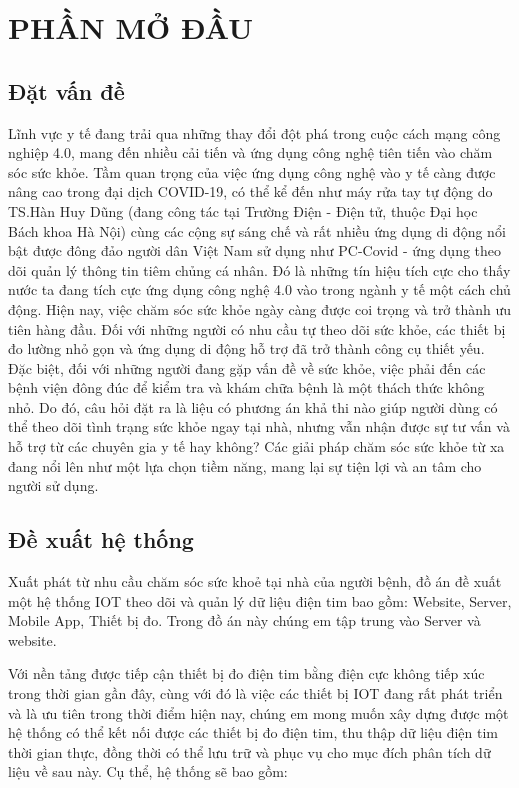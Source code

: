 
\section*{PHẦN MỞ ĐẦU}
\subsection*{Đặt vấn đề}


Lĩnh vực y tế đang trải qua những thay đổi đột phá trong cuộc cách mạng công nghiệp 4.0, mang đến nhiều cải tiến và ứng dụng công nghệ tiên tiến vào chăm sóc sức khỏe.
Tầm quan trọng của việc ứng dụng công nghệ vào y tế càng được nâng cao trong đại dịch COVID-19,
có thể kể đến như máy rửa tay tự động do TS.Hàn Huy Dũng (đang công tác tại Trường Điện - Điện tử, thuộc Đại học Bách khoa Hà Nội) 
cùng các cộng sự sáng chế \cite{ref_thay_dzung} và rất nhiều ứng dụng di động nổi bật được đông đảo người dân Việt Nam sử dụng như PC-Covid - ứng dụng theo dõi quản lý thông tin tiêm chủng cá nhân. Đó là những tín hiệu tích cực cho thấy nước ta đang tích cực ứng
dụng công nghệ 4.0 vào trong ngành y tế một cách chủ động. Hiện nay, việc chăm sóc sức khỏe ngày càng được coi trọng và trở thành ưu tiên hàng đầu. Đối
 với những người có nhu cầu tự theo dõi sức khỏe, các thiết bị đo lường nhỏ gọn và ứng dụng di động hỗ trợ đã trở thành công cụ thiết yếu. Đặc biệt,
  đối với những người đang gặp vấn đề về sức khỏe, việc phải đến các bệnh viện đông đúc để kiểm tra và khám chữa bệnh là một thách thức không nhỏ. Do đó,
   câu hỏi đặt ra là liệu có phương án khả thi nào giúp người dùng có thể theo dõi tình trạng sức khỏe ngay tại nhà, nhưng vẫn nhận được sự tư vấn và hỗ trợ từ các chuyên gia y tế hay không? Các giải pháp chăm sóc sức khỏe từ xa đang nổi lên như một lựa chọn tiềm năng, mang lại sự tiện lợi và an tâm cho người sử dụng.

\subsection*{Đề xuất hệ thống}

Xuất phát từ nhu cầu chăm sóc sức khoẻ tại nhà của người bệnh, đồ án đề xuất một hệ thống IOT theo dõi và quản lý dữ liệu điện tim bao gồm: Website, Server, Mobile App, Thiết bị đo. Trong đồ án này chúng em tập trung vào Server và website.

Với nền tảng được tiếp cận thiết bị đo điện tim bằng điện cực không tiếp xúc trong thời gian gần đây, 
cùng với đó là việc các thiết bị IOT đang rất phát triển và là ưu tiên trong thời điểm hiện nay, chúng em mong muốn xây dựng được một hệ thống
có thể kết nối được các thiết bị đo điện tim, thu thập dữ liệu điện tim thời gian thực, đồng thời có thể lưu trữ và phục vụ cho mục đích
phân tích dữ liệu về sau này. Cụ thể, hệ thống sẽ bao gồm:

